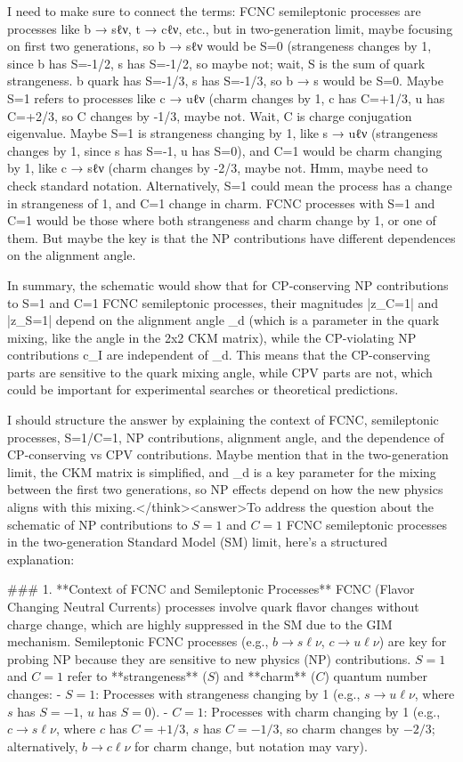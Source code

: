 I need to make sure to connect the terms: FCNC semileptonic processes are processes like b → sℓν, t → cℓν, etc., but in two-generation limit, maybe focusing on first two generations, so b → sℓν would be S=0 (strangeness changes by 1, since b has S=-1/2, s has S=-1/2, so maybe not; wait, S is the sum of quark strangeness. b quark has S=-1/3, s has S=-1/3, so b → s would be S=0. Maybe S=1 refers to processes like c → uℓν (charm changes by 1, c has C=+1/3, u has C=+2/3, so C changes by -1/3, maybe not. Wait, C is charge conjugation eigenvalue. Maybe S=1 is strangeness changing by 1, like s → uℓν (strangeness changes by 1, since s has S=-1, u has S=0), and C=1 would be charm changing by 1, like c → sℓν (charm changes by -2/3, maybe not. Hmm, maybe need to check standard notation. Alternatively, S=1 could mean the process has a change in strangeness of 1, and C=1 change in charm. FCNC processes with S=1 and C=1 would be those where both strangeness and charm change by 1, or one of them. But maybe the key is that the NP contributions have different dependences on the alignment angle. 

In summary, the schematic would show that for CP-conserving NP contributions to S=1 and C=1 FCNC semileptonic processes, their magnitudes |z_C=1| and |z_S=1| depend on the alignment angle _d (which is a parameter in the quark mixing, like the angle in the 2x2 CKM matrix), while the CP-violating NP contributions c_I are independent of _d. This means that the CP-conserving parts are sensitive to the quark mixing angle, while CPV parts are not, which could be important for experimental searches or theoretical predictions. 

I should structure the answer by explaining the context of FCNC, semileptonic processes, S=1/C=1, NP contributions, alignment angle, and the dependence of CP-conserving vs CPV contributions. Maybe mention that in the two-generation limit, the CKM matrix is simplified, and _d is a key parameter for the mixing between the first two generations, so NP effects depend on how the new physics aligns with this mixing.</think><answer>To address the question about the schematic of NP contributions to \( S=1 \) and \( C=1 \) FCNC semileptonic processes in the two-generation Standard Model (SM) limit, here’s a structured explanation:  


### 1. **Context of FCNC and Semileptonic Processes**  
FCNC (Flavor Changing Neutral Currents) processes involve quark flavor changes without charge change, which are highly suppressed in the SM due to the GIM mechanism. Semileptonic FCNC processes (e.g., \( b \to s\ell\nu \), \( c \to u\ell\nu \)) are key for probing NP because they are sensitive to new physics (NP) contributions. \( S=1 \) and \( C=1 \) refer to **strangeness** (\( S \)) and **charm** (\( C \)) quantum number changes:  
- \( S=1 \): Processes with strangeness changing by 1 (e.g., \( s \to u\ell\nu \), where \( s \) has \( S=-1 \), \( u \) has \( S=0 \)).  
- \( C=1 \): Processes with charm changing by 1 (e.g., \( c \to s\ell\nu \), where \( c \) has \( C=+1/3 \), \( s \) has \( C=-1/3 \), so charm changes by \( -2/3 \); alternatively, \( b \to c\ell\nu \) for charm change, but notation may vary).  


